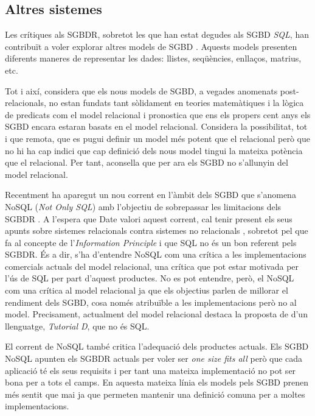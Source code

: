 \subsection{Altres sistemes}

Les crítiques als SGBDR, sobretot les que han estat degudes als SGBD
\emph{SQL}, han contribuït a voler explorar altres models de
SGBD \parencite{stonebraker09}. Aquests models presenten diferents
maneres de representar les dades: llistes, seqüències, enllaços,
matrius, etc.

Tot i així, \textcite[cap.~21--25]{date06} considera que els nous
models de SGBD, a vegades anomenats post-relacionals, no estan fundats
tant sòlidament en teories matemàtiques i la lògica de predicats com
el model relacional i pronostica que ens els propers cent anys els
SGBD encara estaran basats en el model
relacional. %
Considera la possibilitat, tot i que remota, que es pugui definir un
model més potent que el relacional però que no hi ha cap indici que
cap definició dels nous model tingui la mateixa potència que el
relacional. Per tant, aconsella que per ara els SGBD no s'allunyin del
model relacional. %




Recentment ha aparegut un nou corrent en l'àmbit dels SGBD que s'anomena NoSQL (\emph{Not Only SQL}) amb l'objectiu de sobrepassar les limitacions dels SGBDR \parencite{edlich:nosql,stonebraker10}. 
A l'espera que Date valori aquest corrent, cal tenir present els seus apunts sobre sistemes relacionals contra sistemes no relacionals \parencite[part 7]{date06}, sobretot pel que fa al concepte de l'\emph{Information Principle} i que SQL no és un bon referent pels SGBDR. És a dir, s'ha d'entendre NoSQL com una crítica a les implementacions comercials actuals del model relacional, una crítica que pot estar motivada per l'ús de SQL per part d'aquest productes. 
No es pot entendre, però, el NoSQL com una crítica al model relacional ja que els objectius parlen de millorar el rendiment dels SGBD, cosa només atribuïble a les implementacions però no al model. Precisament, actualment del model relacional destaca la proposta de \citeauthor{date:tutoriald} d'un llenguatge, \emph{Tutorial D}, que no és SQL.


El corrent de NoSQL també critica l'adequació dels productes actuals.
Els SGBD NoSQL apunten els SGBDR actuals per voler ser \emph{one size fits all} \parencite{stonebraker07,stonebraker09} però que cada aplicació té els seus requisits i per tant una mateixa implementació no pot ser bona per a tots el camps.
En aquesta mateixa línia els models pels SGBD prenen més sentit que mai ja que permeten mantenir una definició comuna per a moltes implementacions.


